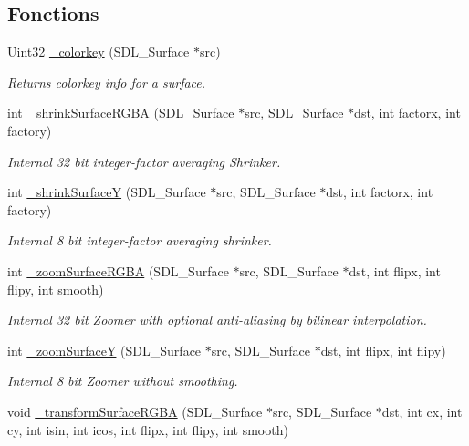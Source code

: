 \subsection*{Fonctions}
\begin{DoxyCompactItemize}
\item 
Uint32 \hyperlink{a00044_afe2a2e4dc6cc462c5fc98a2110b8e1ce}{\_\-colorkey} (SDL\_\-Surface $\ast$src)
\begin{DoxyCompactList}\small\item\em Returns colorkey info for a surface. \end{DoxyCompactList}\item 
int \hyperlink{a00044_ac1bde824f44ae9a76930e9782b783512}{\_\-shrinkSurfaceRGBA} (SDL\_\-Surface $\ast$src, SDL\_\-Surface $\ast$dst, int factorx, int factory)
\begin{DoxyCompactList}\small\item\em Internal 32 bit integer-\/factor averaging Shrinker. \end{DoxyCompactList}\item 
int \hyperlink{a00044_aadb38a61ab6727e5fd621b63418399be}{\_\-shrinkSurfaceY} (SDL\_\-Surface $\ast$src, SDL\_\-Surface $\ast$dst, int factorx, int factory)
\begin{DoxyCompactList}\small\item\em Internal 8 bit integer-\/factor averaging shrinker. \end{DoxyCompactList}\item 
int \hyperlink{a00044_a9898b12bb565c4075c2da4db4891fd81}{\_\-zoomSurfaceRGBA} (SDL\_\-Surface $\ast$src, SDL\_\-Surface $\ast$dst, int flipx, int flipy, int smooth)
\begin{DoxyCompactList}\small\item\em Internal 32 bit Zoomer with optional anti-\/aliasing by bilinear interpolation. \end{DoxyCompactList}\item 
int \hyperlink{a00044_acfeb5a322cbb575f105f1762d9d21c29}{\_\-zoomSurfaceY} (SDL\_\-Surface $\ast$src, SDL\_\-Surface $\ast$dst, int flipx, int flipy)
\begin{DoxyCompactList}\small\item\em Internal 8 bit Zoomer without smoothing. \end{DoxyCompactList}\item 
void \hyperlink{a00044_aae634e7b5e6ec1622fec361ecbd0d1b7}{\_\-transformSurfaceRGBA} (SDL\_\-Surface $\ast$src, SDL\_\-Surface $\ast$dst, int cx, int cy, int isin, int icos, int flipx, int flipy, int smooth)

\end{DoxyCompactItemize}
